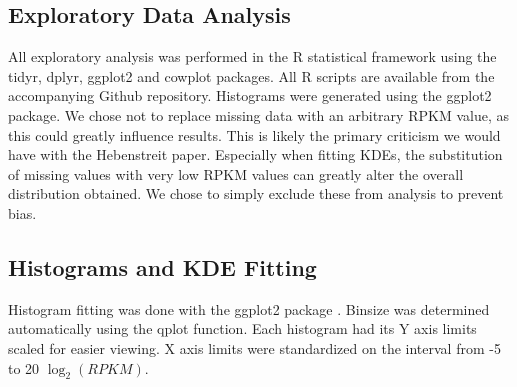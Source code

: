 \documentclass[12pt]{report}
\begin{document}


\subsection*{Exploratory Data Analysis}
All exploratory analysis was performed in the R statistical framework using the tidyr, dplyr, ggplot2 and cowplot packages.
All R scripts are available from the accompanying Github repository. Histograms were generated using the ggplot2
package. We chose not to replace missing data with an arbitrary RPKM value, as this could greatly influence results. This is likely the primary criticism we
would have with the Hebenstreit paper. Especially when fitting KDEs, the substitution of missing values with very low RPKM values can greatly
alter the overall distribution obtained. We chose to simply exclude these from analysis to prevent bias.


\subsection*{Histograms and KDE Fitting}
Histogram fitting was done with the ggplot2 package \cite{ggplot2}. Binsize was determined automatically using the qplot function. Each histogram had its Y axis limits scaled for easier viewing.
X axis limits were standardized on the interval from -5 to 20 $\log_{2}(RPKM)$.
\end{document}

